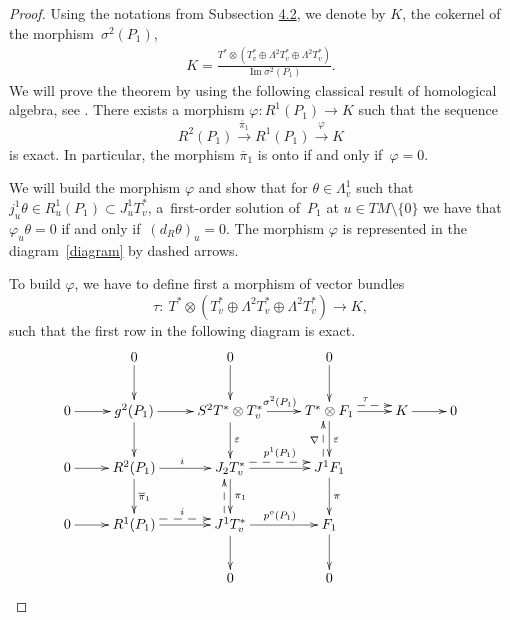 \documentclass[11pt]{article}
\numberwithin{equation}{section}
\begin{document}
\begin{proof}
Using the notations from Subsection \href{https://doi.org/10.3842/SIGMA.2011.114}{4.2}, we denote by $K$, the cokernel of the morphism~$\sigma^2(P_1)$,
\begin{gather} K=\frac{T^*\otimes \left(T^*_v \oplus
\Lambda^2T^*_v \oplus \Lambda^2 T^*_v\right)}{\operatorname{Im}
\sigma^2(P_1)}. \label{spacek} \end{gather}
We will prove the theorem by using the following classical result of
homological algebra, see \cite[Proposition~1.1]{grifone00}. There
exists a morphism $\varphi: R^1(P_1) \to K$ such that the sequence
\[
 R^2(P_1)\overset{\overline{\pi}_1}{\longrightarrow} R^1(P_1)
\overset{\varphi}{\longrightarrow} K
\] is exact. In particular, the
morphism  $\overline{\pi}_1$ is onto if and only if~$\varphi=0$.

We will build the morphism $\varphi$ and show that for $\theta \in
\Lambda^1_v$ such that $j^1_u\theta \in R^1_u(P_1)\subset J^1_uT^*_v$, a~f\/irst-order
solution of~$P_1$ at $u\in TM\setminus\{0\}$ we have that
$\varphi_u\theta=0$ if and only if~$(d_R\theta)_u=0$. The morphism
$\varphi$ is represented in the diagram~\eqref{diagram} by dashed
arrows.

To build $\varphi$, we have to def\/ine f\/irst a morphism of vector bundles
\[
 \tau: \ T^*\otimes \left(T^*_v \oplus
\Lambda^2T^*_v \oplus \Lambda^2 T^*_v\right) \to K,
\] such that the
f\/irst row in the following diagram is exact.
\begin{gather}
  \label{diagram}
  {\diagram
 &  0 \dto  & 0 \dto & 0 \dto
  \\
 0\rto & g^2(P_1) \rto \dto & S^{2}T^*\otimes T^*_v \rto^{\sigma^2(P_1)} \dto^{\varepsilon} & T^* \otimes
  F_1 \rto \rdashed<1ex>|>{\tip}^{\tau} \dto^{\varepsilon} &
  K \rto & 0
  \\
 0 \rto &   R^{2}(P_1) \rto^{i} \dto^{\overline {\pi}_{1}} & J_{2} T^*_v \rto \dto^{\pi_{1}}
  \rdashed<1ex>|>{\tip}^{p^1(P_1)}
  & J^1 F_1 \dto^{\pi} \udashed<1ex>|>{\tip}^{\nabla}
  \\
  0 \rto & R^1(P_1) \rto\rdashed<1ex>|>{\tip}^i  & J^1T^*_v \rto^{p^o(P_1)}
  \udashed<1ex>|>{\tip}  \dto & F_1 \dto
  \\
&  & 0 & 0
  \enddiagram}
\end{gather}


\end{proof}
\end{document}

